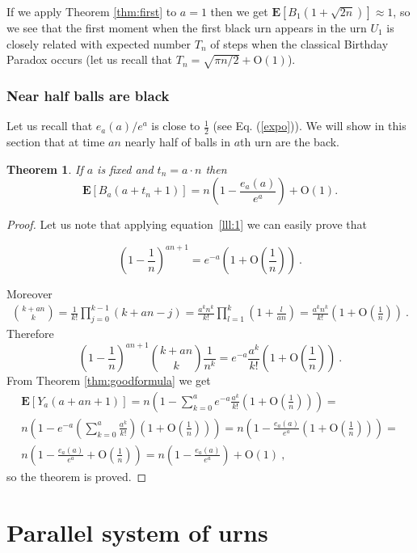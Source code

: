 \documentclass[submission]{dmtcs}
\newtheorem{theorem}{Theorem}
\newcommand{\E}[1]{\mathbf{E}\left[#1\right]}
\newcommand{\BigO}[1]{\mathrm{O}\left(#1\right)}
\begin{document}
If we apply Theorem \ref{thm:first} to $a=1$ then we get
$\E{B_1(1+\sqrt{2n})} \approx 1$, so we see that the first moment when the first 
black urn appears in the urn $U_1$ is closely related with expected number $T_n$
of steps when the classical Birthday Paradox occurs (let us recall that 
$T_n = \sqrt{\pi n/2} + \BigO{1}$).

\subsubsection{Near half balls are black}

Let us recall that $e_a(a)/{e^a}$ is close to $\frac12$ (see Eq. (\ref{expo})). 
We will show in this section that at time $an$ nearly half of balls 
in $a$th urn are the back.

\begin{theorem}\label{thm7xc}
If $a$ is fixed and $t_n = a\cdot n$ then
$$
  \E{B_{a}(a+t_n+1)} = n\left(1-\frac{e_a(a)}{e^a}\right) + \BigO{1}.
$$
\end{theorem}


\begin{proof}

Let us note that applying equation~\ref{lll:1} we can easily prove that 

$$(1-\frac1n)^{an+1} = e^{-a}(1+\BigO{\frac1n})~.$$

Moreover
\begin{gather*}
\binom{k+a n}{k} = \frac{1}{k!} \prod_{j=0}^{k-1} (k+an-j) = 
\frac{a^k n^k}{k!} \prod_{l=1}^{k} (1+\frac{l}{a n}) =
\frac{a^k n^k}{k!}(1+\BigO{\frac1n})~.
\end{gather*}
Therefore
$$
(1-\frac1n)^{an+1} \binom{k+a n}{k} \frac{1}{n^k} = 
e^{-a} \frac{a^k}{k!}(1+\BigO{\frac1n})~.
$$
From Theorem \ref{thm:goodformula} we get
\begin{gather*}
 \E{Y_a(a+an+1)} = 
 n\left(1 - \sum_{k=0}^{a} e^{-a} \frac{a^k}{k!}(1+\BigO{\frac1n})\right) = \\
 n\left(1 - e^{-a} (\sum_{k=0}^{a} \frac{a^k}{k!}) (1+\BigO{\frac1n})\right) = 
 n\left(1 - \frac{e_a(a)}{e^a} (1+\BigO{\frac1n})\right) = \\
 n\left(1 - \frac{e_a(a)}{e^a} + \BigO{\frac1n}\right) =
 n\left(1 - \frac{e_a(a)}{e^a}\right) + \BigO{1}~,
\end{gather*}
so the theorem is proved.
\end{proof}




\section{Parallel system of urns}\label{Parallel}
\end{document}
